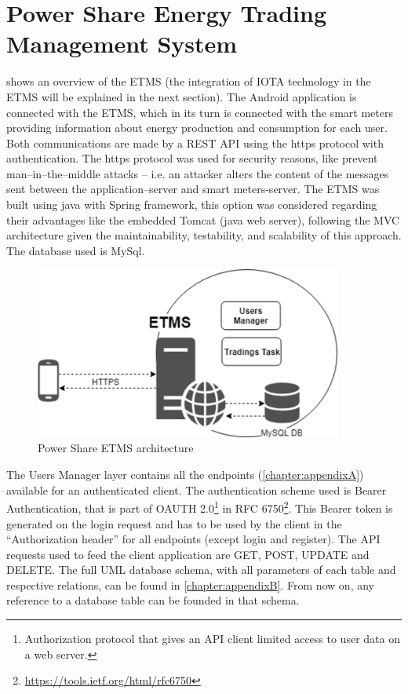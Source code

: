 \section{Power Share Energy Trading Management System}\label{psetms}


 shows an overview of the \ac{ETMS} (the integration of IOTA technology in the \ac{ETMS} will be explained in the next section). The Android application is connected with the \ac{ETMS}, which in its turn is connected with the smart meters providing information about energy production and consumption for each user. Both communications are made by a REST \ac{API} using the https protocol with authentication. The https protocol was used for security reasons, like prevent man--in--the--middle attacks -- i.e. an attacker alters the content of the messages sent between the application--server and smart meters-server.
The \ac{ETMS} was built using java with Spring framework, this option was considered regarding their advantages like the embedded Tomcat (java web server), following the \ac{MVC} architecture given the maintainability, testability, and scalability of this approach. The database used is MySql.


\begin{figure}[h]
\centering
\includegraphics[width=0.9\textwidth]{./Images/ps12}
\caption{Power Share \ac{ETMS} architecture}
\label{fig:ps12}
\end{figure}

The Users Manager layer contains all the endpoints (\cref{chapter:appendixA}) available for an authenticated client. The authentication scheme used is Bearer Authentication, that is part of OAUTH 2.0\footnote{Authorization protocol that gives an \ac{API} client limited access to user data on a web server.} in RFC 6750\footnote{\url{https://tools.ietf.org/html/rfc6750}}. This Bearer token is generated on the login request and has to be used by the client in the “Authorization header” for all endpoints (except login and register). The \ac{API} requests used to feed the client application are GET, POST, UPDATE and DELETE. The full \ac{UML} database schema, with all parameters of each table and respective relations, can be found in \cref{chapter:appendixB}. From now on, any reference to a database table can be founded in that schema. 


